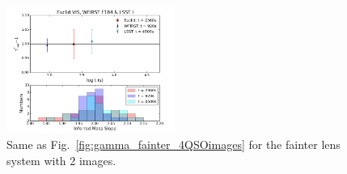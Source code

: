 \documentclass[a4paper,11pt]{article}
\begin{document}
\begin{figure}
\begin{center}
\includegraphics[width=0.49\textwidth]{figures/gamma_hist_135949anti_2QSO_EWL.png}
\end{center}
\caption{Same as Fig.~\ref{fig:gamma_fainter_4QSOimages} for the fainter lens system with 2 images.
\label{fig:gamma_fainter_2QSOimages}}
\end{figure}
\end{document}
